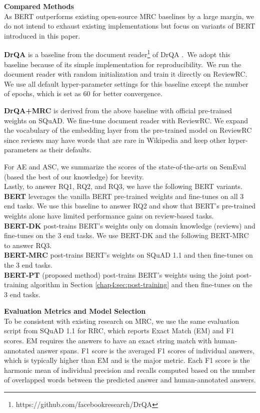 \textbf{Compared Methods}\\
As BERT outperforms existing open-source MRC baselines by a large margin, we do not intend to exhaust existing implementations but focus on variants of BERT introduced in this paper.

\textbf{DrQA} is a baseline from the document reader\footnote{https://github.com/facebookresearch/DrQA} of DrQA \cite{chen2017reading}.~We adopt this baseline because of its simple implementation for reproducibility.~We run the document reader with random initialization and train it directly on ReviewRC.
We use all default hyper-parameter settings for this baseline except the number of epochs, which is set as 60 for better convergence.

\textbf{DrQA+MRC} is derived from the above baseline with official pre-trained weights on SQuAD.
We fine-tune document reader with ReviewRC. We expand the vocabulary of the embedding layer from the pre-trained model on ReviewRC since reviews may have words that are rare in Wikipedia and keep other hyper-parameters as their defaults.

For AE and ASC, we summarize the scores of the state-of-the-arts on SemEval (based the best of our knowledge) for brevity.\\

Lastly, to answer RQ1, RQ2, and RQ3, we have the following BERT variants.\\
\textbf{BERT} leverages the vanilla BERT pre-trained weights and fine-tunes on all 3 end tasks. We use this baseline to answer RQ2 and show that BERT's pre-trained weights alone have limited performance gains on review-based tasks.\\
\textbf{BERT-DK} post-trains BERT's weights only on domain knowledge (reviews) and fine-tunes on the 3 end tasks. We use BERT-DK and the following BERT-MRC to answer RQ3.\\
\textbf{BERT-MRC} post-trains BERT's weights on SQuAD 1.1 and then fine-tunes on the 3 end tasks.\\
\textbf{BERT-PT} (proposed method) post-trains BERT's weights using the joint post-training algorithm in Section \ref{chap4:sec:post-training} and then fine-tunes on the 3 end tasks.

\textbf{Evaluation Metrics and Model Selection}\\
To be consistent with existing research on MRC,
we use the same evaluation script from SQuAD 1.1 \cite{rajpurkar2016squad} for RRC, which reports Exact Match (EM) and F1 scores.
EM requires the answers to have an exact string match with human-annotated answer spans.
F1 score is the averaged F1 scores of individual answers, which is typically higher than EM and is the major metric.
Each F1 score is the harmonic mean of individual precision and recalls computed based on the number of overlapped words between the predicted answer and human-annotated answers.

